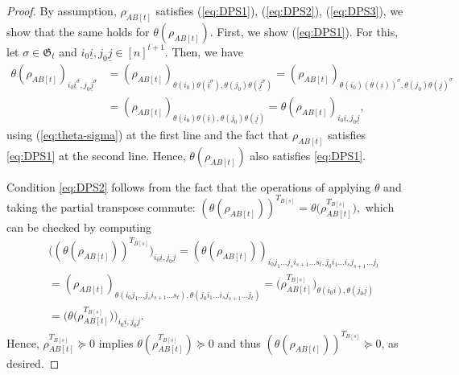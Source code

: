 \documentclass[10pt,a4paper]{amsart}
\newcommand{\Perm}{\mathfrak G}
\newcommand{\ui}{\underline{i}}
\newcommand{\uj}{\underline{j}}
\begin{document}
\begin{proof}
  By assumption,   $\rho_{AB[t]}$ satisfies (\ref{eq:DPS1}),  (\ref{eq:DPS2}), (\ref{eq:DPS3}), we show that the same holds for $\theta(\rho_{AB[t]})$.
First, we show (\ref{eq:DPS1}). For this,    let $\sigma\in \Perm_t$ and $i_0\ui,j_0\uj\in [n]^{t+1}$. Then, we have
    \begin{align*}
        \theta(\rho_{AB[t]})_{i_0\ui^\sigma,j_0\uj^\sigma}&=(\rho_{AB[t]})_{\theta(i_0)\theta(\ui^\sigma),\theta(j_0)\theta(\uj^\sigma)}
        =(\rho_{AB[t]})_{\theta(i_0)(\theta(\ui))^\sigma,\theta(j_0)\theta(\uj)^\sigma}\\
        &=(\rho_{AB[t]})_{\theta(i_0)\theta(\ui),\theta(j_0)\theta(\uj)}
        =\theta(\rho_{AB[t]})_{i_0\ui,j_0\uj},
    \end{align*}
using (\ref{eq:theta-sigma}) at the first line and the fact that $\rho_{AB[t]}$ satisfies \eqref{eq:DPS1} at the second line. Hence, $\theta(\rho_{AB[t]})$ also satisfies \eqref{eq:DPS1}.

    Condition \eqref{eq:DPS2} follows from the fact that the operations of applying $\theta$ and taking the partial transpose commute:
       $ \left(\theta(\rho_{AB[t]})\right)^{T_{B[s]}}=\theta\big(\rho_{AB[t]}^{T_{B[s]}}\big),$
 which can be checked by computing
    \begin{align*}
    &    \big( \left(\theta(\rho_{AB[t]})\right)^{T_{B[s]}}\big)_{i_0\ui,j_0\uj} =
        \left(\theta(\rho_{AB[t]})\right)_{i_0j_1\dots j_si_{s+1}\dots s_t,j_0i_1\dots i_sj_{s+1}\dots j_t}\\
        &=(\rho_{AB[t]})_{\theta(i_0j_1\dots j_si_{s+1}\dots s_t),\theta(j_0i_1\dots i_sj_{s+1}\dots j_t)}
        =\big(\rho_{AB[t]}^{T_{B[s]}}\big)_{\theta(i_0\ui),\theta(j_0\uj)}\\
       & =\big(\theta\big(\rho_{AB[t]}^{T_{B[s]}}\big)\big)_{i_0\ui,j_0\uj}.
    \end{align*}
 Hence, $\rho_{AB[t]}^{T_{B[s]}}\succeq 0$ implies $\theta(\rho_{AB[t]}^{T_{B[s]}})\succeq 0$ and thus
  $(\theta(\rho_{AB[t]}))^{T_{B[s]}}\succeq 0$, as desired. 
      

\end{proof}
\end{document}
